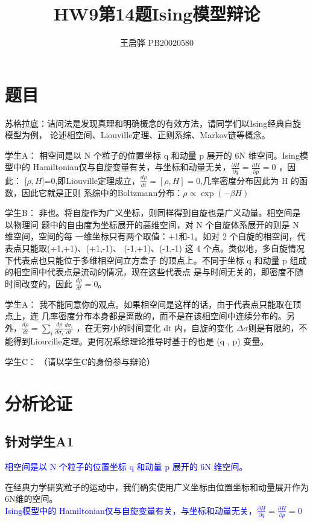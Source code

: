 \documentclass{article}
\title{\songti \zihao{2}\bfseries HW9第14题Ising模型辩论}
\author{王启骅 PB20020580}
\begin{document}
	\maketitle
	\section{题目}
苏格拉底：诘问法是发现真理和明确概念的有效方法，请同学们以Ising经典自旋模型为例，
论述相空间、Liouville定理、正则系综、Markov链等概念。


学生A： 相空间是以 N 个粒子的位置坐标 q 和动量 p 展开的 6N 维空间。Ising模型中的
Hamiltonian仅与自旋变量有关，与坐标和动量无关，$ \frac{\partial H}{\partial q}=\frac{\partial H}{\partial p}=0 $ ，因此： [$ \rho,H $]=0,即Liouville定理成立，$ \frac{d\rho}{dt}=[\rho,H]=0 $,几率密度分布因此为 H 的函数，因此它就是正则
系综中的Boltzmann分布：$ \rho\propto\exp(-\beta H) $


学生B： 非也。将自旋作为广义坐标，则同样得到自旋也是广义动量。相空间是以物理问
题中的自由度为坐标展开的高维空间，对 N 个自旋体系展开的则是 N 维空间，空间的每
一维坐标只有两个取值：+1和-1。如对 2 个自旋的相空间，代表点只能取(+1,+1)、(+1,-1)、
(-1,+1)、(-1,-1) 这 4 个点。类似地，多自旋情况下代表点也只能位于多维相空间立方盒子
的顶点上。不同于坐标 q 和动量 p 组成的相空间中代表点是流动的情况，现在这些代表点
是与时间无关的，即密度不随时间改变的，因此 $ \frac{d\rho}{dt}=0 $。


学生A： 我不能同意你的观点。如果相空间是这样的话，由于代表点只能取在顶点上，连
几率密度分布本身都是离散的，而不是在该相空间中连续分布的。另外，$ \frac{d\rho}{dt}=\sum_{i}\frac{d\rho}{d\sigma_i}\frac{d\sigma_i}{dt} $
，在无穷小的时间变化 dt 内，自旋的变化 $\Delta\sigma$则是有限的，不
能得到Liouville定理。更何况系综理论推导时基于的也是 (q , p) 变量。


学生C： （请以学生C的身份参与辩论）
	\section{分析论证}
\subsection{针对学生A1}
\textcolor{blue}{相空间是以 N 个粒子的位置坐标 q 和动量 p 展开的 6N 维空间。}


在经典力学研究粒子的运动中，我们确实使用广义坐标由位置坐标和动量展开作为6N维的空间。\\


\textcolor{blue}{Ising模型中的
	Hamiltonian仅与自旋变量有关，与坐标和动量无关，$ \frac{\partial H}{\partial q}=\frac{\partial H}{\partial p}=0 $}
\end{document}
